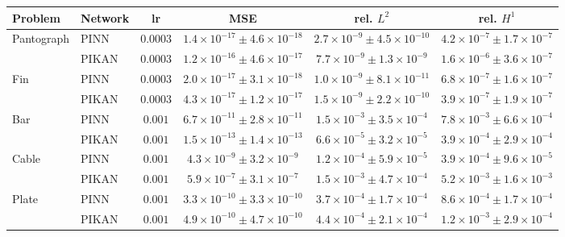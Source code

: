 \begin{tabular}{llcccc}
\toprule
Problem & Network & lr & MSE & rel. $L^2$ & rel. $H^1$\\
\midrule
Pantograph & PINN & $0.0003$ & $1.4{\times}10^{-17}\pm4.6{\times}10^{-18}$ & $2.7{\times}10^{-9}\pm4.5{\times}10^{-10}$ & $4.2{\times}10^{-7}\pm1.7{\times}10^{-7}$\\
 & PIKAN & $0.0003$ & $1.2{\times}10^{-16}\pm4.6{\times}10^{-17}$ & $7.7{\times}10^{-9}\pm1.3{\times}10^{-9}$ & $1.6{\times}10^{-6}\pm3.6{\times}10^{-7}$\\
\addlinespace
Fin & PINN & $0.0003$ & $2.0{\times}10^{-17}\pm3.1{\times}10^{-18}$ & $1.0{\times}10^{-9}\pm8.1{\times}10^{-11}$ & $6.8{\times}10^{-7}\pm1.6{\times}10^{-7}$\\
 & PIKAN & $0.0003$ & $4.3{\times}10^{-17}\pm1.2{\times}10^{-17}$ & $1.5{\times}10^{-9}\pm2.2{\times}10^{-10}$ & $3.9{\times}10^{-7}\pm1.9{\times}10^{-7}$\\
\addlinespace
Bar & PINN & $0.001$ & $6.7{\times}10^{-11}\pm2.8{\times}10^{-11}$ & $1.5{\times}10^{-3}\pm3.5{\times}10^{-4}$ & $7.8{\times}10^{-3}\pm6.6{\times}10^{-4}$\\
 & PIKAN & $0.001$ & $1.5{\times}10^{-13}\pm1.4{\times}10^{-13}$ & $6.6{\times}10^{-5}\pm3.2{\times}10^{-5}$ & $3.9{\times}10^{-4}\pm2.9{\times}10^{-4}$\\
\addlinespace
Cable & PINN & $0.001$ & $4.3{\times}10^{-9}\pm3.2{\times}10^{-9}$ & $1.2{\times}10^{-4}\pm5.9{\times}10^{-5}$ & $3.9{\times}10^{-4}\pm9.6{\times}10^{-5}$\\
 & PIKAN & $0.001$ & $5.9{\times}10^{-7}\pm3.1{\times}10^{-7}$ & $1.5{\times}10^{-3}\pm4.7{\times}10^{-4}$ & $5.2{\times}10^{-3}\pm1.6{\times}10^{-3}$\\
\addlinespace
Plate & PINN & $0.001$ & $3.3{\times}10^{-10}\pm3.3{\times}10^{-10}$ & $3.7{\times}10^{-4}\pm1.7{\times}10^{-4}$ & $8.6{\times}10^{-4}\pm1.7{\times}10^{-4}$\\
 & PIKAN & $0.001$ & $4.9{\times}10^{-10}\pm4.7{\times}10^{-10}$ & $4.4{\times}10^{-4}\pm2.1{\times}10^{-4}$ & $1.2{\times}10^{-3}\pm2.9{\times}10^{-4}$\\
\bottomrule
\end{tabular}
